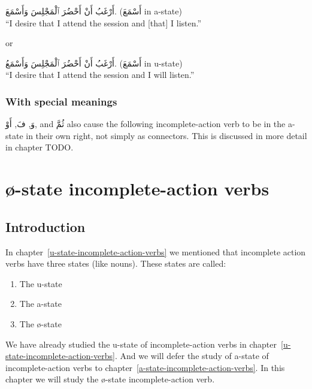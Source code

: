 \documentclass[
  10pt,
]{book}
\providecommand{\tightlist}{%
  \setlength{\itemsep}{0pt}\setlength{\parskip}{0pt}}
\begin{document}
\foreignlanguage{arabic}{أَرْغَبُ أَنْ أَحْضُرَ ٱلْمَجْلِسَ وَأَسْمَعَ.} (\foreignlanguage{arabic}{أَسْمَعَ} in a-state)\\
\enquote{I desire that I attend the session and {[}that{]} I listen.}

or

\foreignlanguage{arabic}{أَرْغَبُ أَنْ أَحْضُرَ ٱلْمَجْلِسَ وَأَسْمَعُ.} (\foreignlanguage{arabic}{أَسْمَعَ} in u-state)\\
\enquote{I desire that I attend the session and I will listen.}

\subsection{With special meanings}\label{with-special-meanings}

\foreignlanguage{arabic}{وَ}, \foreignlanguage{arabic}{فَ}, \foreignlanguage{arabic}{أَوْ}, and \foreignlanguage{arabic}{ثُمَّ} also cause the following incomplete-action verb to be in the a-state in their own right, not simply as connectors. This is discussed in more detail in chapter TODO.

\chapter{ø-state incomplete-action verbs}\label{state-incomplete-action-verbs}

\section{Introduction}\label{introduction-19}

In
chapter~\ref{u-state-incomplete-action-verbs}
we mentioned that incomplete action verbs have three states (like nouns).
These states are called:

\begin{enumerate}
\def\labelenumi{\roman{enumi}.}
\tightlist
\item
  The u-state
\item
  The a-state
\item
  The ø-state
\end{enumerate}

We have already studied the u-state of incomplete-action verbs in
chapter~\ref{u-state-incomplete-action-verbs}.
And we will defer the study of
a-state of incomplete-action verbs to
chapter~\ref{a-state-incomplete-action-verbs}.
In this chapter we will study the
ø-state
incomplete-action verb.
\end{document}
